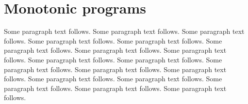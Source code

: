 \chapter{Monotonic programs}
	\label{CH_04}

Some paragraph text follows. Some paragraph text follows. Some paragraph text follows. Some paragraph text follows. Some paragraph text follows. Some paragraph text follows. Some paragraph text follows. Some paragraph text follows. Some paragraph text follows. Some paragraph text follows. Some paragraph text follows. Some paragraph text follows. Some paragraph text follows. Some paragraph text follows. Some paragraph text follows. Some paragraph text follows. Some paragraph text follows. Some paragraph text follows. 
